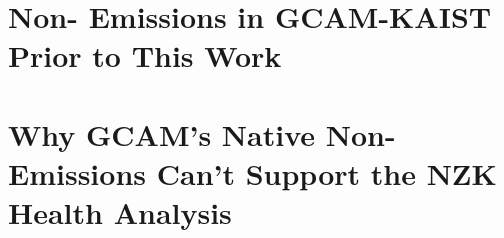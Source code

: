 
\section{Non-\COtwo{} Emissions in GCAM-KAIST Prior to This Work}\label{sec:prior}



\section{Why GCAM's Native Non-\COtwo{} Emissions Can't Support the NZK Health Analysis}\label{sec:investigation}


